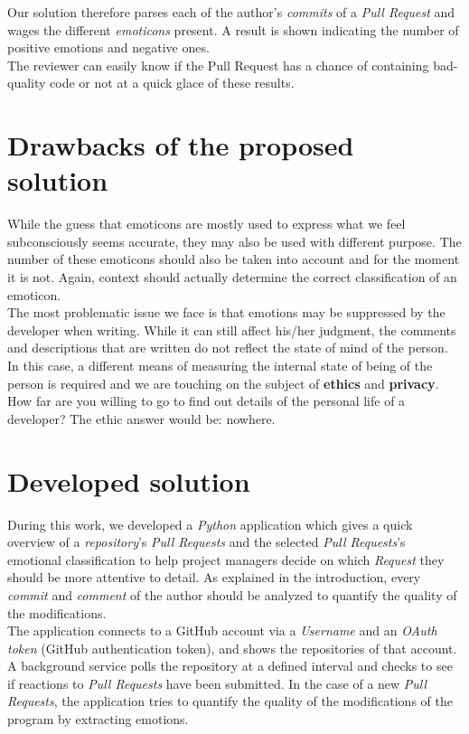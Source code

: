 \documentclass[journal]{IEEEtran}
\begin{document}
Our solution therefore parses each of the author's \emph{commits} of a \emph{Pull Request} and wages the different \emph{emoticons} present. A result is shown indicating the number of positive emotions and negative ones.\\

The reviewer can easily know if the Pull Request has a chance of containing bad-quality code or not at a quick glace of these results.

\section{Drawbacks of the proposed solution}
While the guess that emoticons are mostly used to express what we feel subconsciously seems accurate, they may also be used with different purpose. The number of these emoticons should also be taken into account and for the moment it is not. Again, context should actually determine the correct classification of an emoticon.\\

The most problematic issue we face is that emotions may be suppressed by the developer when writing. While it can still affect his/her judgment, the comments and descriptions that are written do not reflect the state of mind of the person. In this case, a different means of measuring the internal state of being of the person is required and we are touching on the subject of \textbf{ethics} and \textbf{privacy}. How far are you willing to go to find out details of the personal life of a developer? The ethic answer would be: nowhere.

\section{Developed solution}
During this work, we developed a \emph{Python} application which gives a quick overview of a \emph{repository}'s \emph{Pull Requests} and the selected \emph{Pull Requests}'s emotional classification to help project managers decide on which \emph{Request} they should be more attentive to detail.
As explained in the introduction, every \emph{commit} and \emph{comment} of the author should be analyzed to quantify the quality of the modifications.\\

The application connects to a GitHub account via a \emph{Username} and an \emph{OAuth token} (GitHub authentication token), and shows the repositories of that account. A background service polls the repository at a defined interval and checks to see if reactions to \emph{Pull Requests} have been submitted.
In the case of a new \emph{Pull Requests}, the application tries to quantify the quality of the modifications of the program by extracting emotions.
\end{document}
